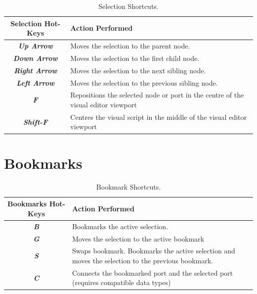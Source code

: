 \begin{table}[htbp]
\begin{minipage}{\linewidth}
\setlength{\tymax}{0.5\linewidth}
\centering
\small
\caption{Selection Shortcuts.}
\label{selectionshortcuts.}
\begin{tabulary}{\textwidth}{@{}CL@{}} \toprule
Selection Hot-Keys&Action Performed\\
\midrule
\textbf{\emph{Up Arrow}}&Moves the selection to the parent node.\\
\textbf{\emph{Down Arrow}}&Moves the selection to the first child node.\\
\textbf{\emph{Right Arrow}}&Moves the selection to the next sibling node.\\
\textbf{\emph{Left Arrow}}&Moves the selection to the previous sibling node.\\
\textbf{\emph{F}}&Repositions the selected node or port in the centre of the visual editor viewport\\
\textbf{\emph{Shift-F}}&Centres the visual script in the middle of the visual editor viewport\\

\bottomrule

\end{tabulary}
\end{minipage}
\end{table}

\section{Bookmarks}
\label{bookmarks}

\begin{table}[htbp]
\begin{minipage}{\linewidth}
\setlength{\tymax}{0.5\linewidth}
\centering
\small
\caption{Bookmark Shortcuts.}
\label{bookmarkshortcuts.}
\begin{tabulary}{\textwidth}{@{}CL@{}} \toprule
Bookmarks Hot-Keys&Action Performed\\
\midrule
\textbf{\emph{B}}&Bookmarks the active selection.\\
\textbf{\emph{G}}&Moves the selection to the active bookmark\\
\textbf{\emph{S}}&Swaps bookmark. Bookmarks the active selection and moves the selection to the previous bookmark.\\
\textbf{\emph{C}}&Connects the bookmarked port and the selected port (requires compatible data types)\\

\bottomrule

\end{tabulary}
\end{minipage}
\end{table}

